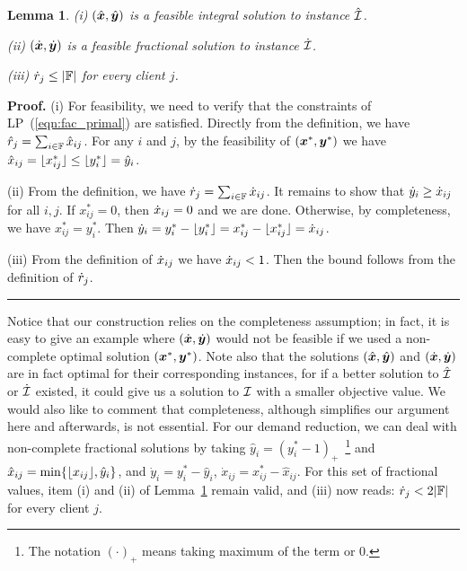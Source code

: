 \documentclass[oneside,final]{ucr}
\newtheorem{lemma}[theorem]{Lemma}
\newenvironment{proof}[1][Proof]{\textbf{#1.} }{\ \rule{0.5em}{0.5em}}
\begin{document}

\begin{lemma}\label{lem: polynomial demands partition}
{\rm (i)}
  $(\hat{\boldsymbol{x}}, \hat{\boldsymbol{y}})$ is a feasible integral solution to
  instance $\hatcalI$.

\noindent
{\rm (ii)}
  $(\dot{\boldsymbol{x}}, \dot{\boldsymbol{y}})$ is a feasible fractional
  solution to instance $\dotcalI$.

\noindent
{\rm (iii)}
${\dot r}_j\leq |\mathbb{F}|$ for every client $j$.

\end{lemma}
\begin{proof}
(i) For feasibility, we need to verify that the constraints of LP~(\ref{eqn:fac_primal})
are satisfied. Directly from the definition, we have ${\hat r}_j = \sum_{i\in\mathbb{F}} {\hat x}_{ij}$.
For any $i$ and $j$, by the feasibility of $(\boldsymbol{x}^\ast,\boldsymbol{y}^\ast)$ we have
${\hat x}_{ij} = { \lfloor x_{ij}^\ast \rfloor } \le { \lfloor y^\ast_i \rfloor } = {\hat y}_i$.

(ii) From the definition, we have  ${\dot r}_j = \sum_{i\in\mathbb{F}} {\dot x}_{ij}$.
It remains to show that ${\dot y}_i \geq {\dot x}_{ij}$ for all $i,j$. 
If $x_{ij}^\ast=0$, then ${\dot x}_{ij}=0$ and we are done. 
Otherwise, by completeness, we have $x_{ij}^\ast=y_i^\ast$. 
Then  ${\dot y}_i = y_i^\ast - { \lfloor y_i^\ast \rfloor } = x_{ij}^\ast - { \lfloor x_{ij}^\ast \rfloor } ={\dot x}_{ij}$. 

(iii) From the definition of ${\dot x}_{ij}$ we have
  ${\dot x}_{ij} < 1$.  Then the bound follows from the definition of ${\dot r}_j$.
\end{proof}

Notice that our construction relies on the completeness
assumption; in fact, it is easy to give an example where
$(\dot{\boldsymbol{x}}, \dot{\boldsymbol{y}})$ would not be feasible if we used a
non-complete optimal solution $(\boldsymbol{x}^\ast,\boldsymbol{y}^\ast)$.  Note
also that the solutions $(\hat{\boldsymbol{x}},\hat{\boldsymbol{y}})$ and $(\dot{\boldsymbol{x}},
\dot{\boldsymbol{y}})$ are in fact optimal for their corresponding
instances, for if a better solution to $\hatcalI$ or
$\dotcalI$ existed, it could give us a solution to $\mathcal{I}$
with a smaller objective value. We would also like to
comment that completeness, although simplifies our argument
here and afterwards, is not essential. For our demand
reduction, we can deal with non-complete fractional
solutions by taking $\hat y_i = (y_i^\ast -
1)_+$~\footnote{The notation $(\cdot)_+$ means taking
  maximum of the term or 0.} and $\hat x_{ij} =
\min\{{ \lfloor x_{ij} \rfloor }, \hat y_i\}$, and $\dot y_i = y_i^\ast
- \hat y_i$, $\dot x_{ij} = x_{ij}^\ast - \hat x_{ij}$. For
this set of fractional values, item (i) and (ii) of
Lemma~\ref{lem: polynomial demands partition} remain valid,
and (iii) now reads: $\dot r_j < 2|\mathbb{F}|$ for every
client $j$.
\end{document}
